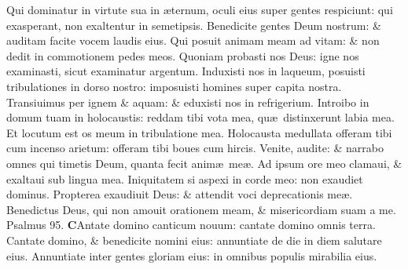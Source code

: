 \documentclass[a5paper,10pt]{book}
\def\ae{æ}
\begin{document}
\begin{multicols*}{2}
\newline \color{red} Q\color{black}ui dominatur in virtute sua in \ae ternum, oculi eius super gentes respiciunt: qui exasperant, non exaltentur in semetipsis.
\newline \color{red} B\color{black}enedicite gentes Deum nostrum: \& auditam facite vocem laudis eius.
\newline \color{red} Q\color{black}ui posuit animam meam ad vitam: \& non dedit in commotionem pedes meos.
\newline \color{red} Q\color{black}uoniam probasti nos Deus: igne nos examinasti, sicut examinatur argentum.
\newline \color{red} I\color{black}nduxisti nos in laqueum, posuisti tribulationes in dorso nostro: imposuisti homines super capita nostra.
\newline \color{red} T\color{black}ransiuimus per ignem \& aquam: \& eduxisti nos in refrigerium.
\newline \color{red} I\color{black}ntroibo in domum tuam in holocaustis: reddam tibi vota mea, qu\ae \ distinxerunt labia mea.
\newline \color{red} E\color{black}t locutum est os meum in tribulatione mea.
\newline \color{red} H\color{black}olocausta medullata offeram tibi cum incenso arietum: offeram tibi boues cum hircis.
\newline \color{red} V\color{black}enite, audite: \& narrabo omnes qui timetis Deum, quanta fecit anim\ae \ me\ae .
\newline \color{red} A\color{black}d ipsum ore meo clamaui, \& exaltaui sub lingua mea.%
\newline \color{red} I\color{black}niquitatem si aspexi in corde meo: non exaudiet dominus.
\newline \color{red} P\color{black}ropterea exaudiuit Deus: \& attendit voci deprecationis me\ae .
\newline \color{red} B\color{black}enedictus Deus, qui non amouit orationem meam, \& misericordiam suam a me. \quad \color{red} Psalmus \hypertarget{ps95}{95.} \color{black}
\vspace{-1em}
\lettrine[lines=2]{\bfseries \color{red} C}{}Antate domino canticum nouum: cantate domino omnis terra.
\newline \color{red} C\color{black}antate domino, \& benedicite nomini eius: annuntiate de die in diem salutare eius.
\newline \color{red} A\color{black}nnuntiate inter gentes gloriam eius: in omnibus populis mirabilia eius.

\end{multicols*}
\end{document}

